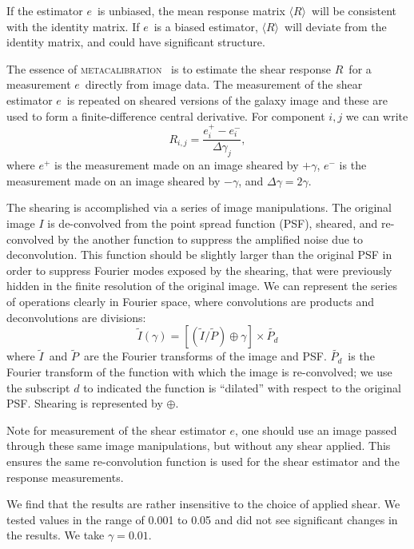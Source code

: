 \documentclass[iop]{emulateapj}
\newcommand{\vest}{\mbox{\boldmath $e$}}
\newcommand{\est}{e}
\newcommand{\mcal}{\textsc{metacalibration}}
\newcommand{\mcalR}{\mbox{\boldmath $R$}}
\newcommand{\mcalRmean}{\mbox{\boldmath $\langle R \rangle$}}
\newcommand{\Itild}{\mbox{$\widetilde{I}$}}
\newcommand{\Ptil}{\mbox{$\widetilde{P}$}}
\newcommand{\Ptild}{\mbox{$\widetilde{P_d}$}}
\begin{document}
If the estimator \vest\ is unbiased, the mean response matrix \mcalRmean\
will be consistent with the identity matrix.  If \vest\ is a biased
estimator, \mcalRmean\ will deviate from the identity matrix,
and could have significant structure.


The essence of \mcal\ \citep{HuffMcal} is to estimate the shear response
\mcalR\ for a measurement \vest\ directly from image data.  The measurement of
the shear estimator \vest\ is repeated on sheared versions of the galaxy
image and these are used to form a finite-difference central derivative.
For component $i,j$ we can write
\begin{equation} \label{eq:Rnum}
    R_{i,j} = \frac{\est_i^+ - \est_i^-}{\Delta \gamma_j},
\end{equation}
where $\est^+$ is the measurement made on an image sheared by $+\gamma$,
$\est^-$ is the measurement made on an image sheared by $-\gamma$,
and $\Delta \gamma = 2\gamma$.

The shearing is accomplished via a series of image manipulations. The original
image $I$ is de-convolved from the point spread function (PSF), sheared, and
re-convolved by the another function to suppress the amplified noise due to
deconvolution.  This function should be slightly larger than the original PSF
in order to suppress Fourier modes exposed by the shearing, that were
previously hidden in the finite resolution of the original image.  We can
represent the series of operations clearly in Fourier space, where
convolutions are products and deconvolutions are divisions:
\begin{equation}
    \Itild(\gamma) = \left[ \left( \Itild/\Ptil \right) \oplus \gamma \right] \times \Ptild
\end{equation}
where \Itild\ and \Ptil\ are the Fourier transforms of the image and PSF.
\Ptild\ is the Fourier transform of the function with which the image
is re-convolved; we use the subscript $d$ to indicated the function
is ``dilated'' with respect to the original PSF.
Shearing is represented by $\oplus$.

Note for measurement of the shear estimator \vest, one should use an image
passed through these same image manipulations, but without any shear applied.
This ensures the same re-convolution function is used for the shear estimator
and the response measurements.

We find that the results are rather insensitive to the choice of applied shear.
We tested values in the range of 0.001 to 0.05 and did not see significant
changes in the results. We take $\gamma=0.01$.
\end{document}
